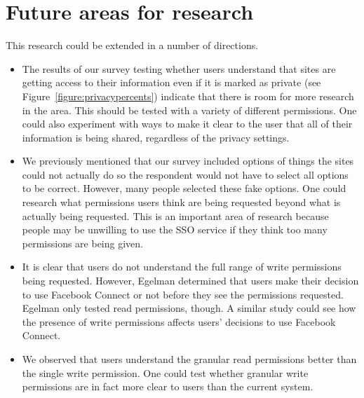 \documentclass{sig-alternate}
\begin{document}

\section{Future areas for research}

This research could be extended in a number of directions.

\begin{itemize}
  \item The results of our survey testing whether users understand that sites are getting access to their information even if it is marked as private (see Figure~\ref{figure:privacypercents}) indicate that there is room for more research in the area. This should be tested with a variety of different permissions. One could also experiment with ways to make it clear to the user that all of their information is being shared, regardless of the privacy settings.
  \item We previously mentioned that our survey included options of things the sites could not actually do so the respondent would not have to select all options to be correct. However, many people selected these fake options. One could research what permissions users think are being requested beyond what is actually being requested. This is an important area of research because people may be unwilling to use the SSO service if they think too many permissions are being given.
  \item It is clear that users do not understand the full range of write permissions being requested. However, Egelman \cite{egelman} determined that users make their decision to use Facebook Connect or not before they see the permissions requested. Egelman only tested read permissions, though. A similar study could see how the presence of write permissions affects users' decisions to use Facebook Connect. 
  \item We observed that users understand the granular read permissions better than the single write permission. One could test whether granular write permissions are in fact more clear to users than the current system. 
\end{itemize}
\end{document}
